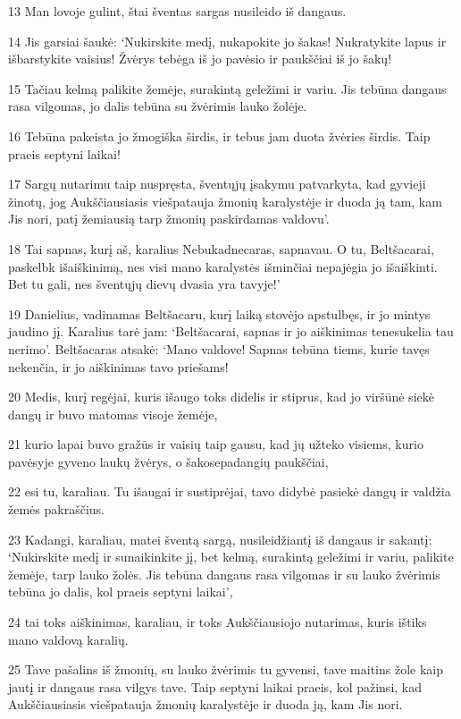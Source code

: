 \par 13 Man lovoje gulint, štai šventas sargas nusileido iš dangaus. 
\par 14 Jis garsiai šaukė: ‘Nukirskite medį, nukapokite jo šakas! Nukratykite lapus ir išbarstykite vaisius! Žvėrys tebėga iš jo pavėsio ir paukščiai iš jo šakų! 
\par 15 Tačiau kelmą palikite žemėje, surakintą geležimi ir variu. Jis tebūna dangaus rasa vilgomas, jo dalis tebūna su žvėrimis lauko žolėje. 
\par 16 Tebūna pakeista jo žmogiška širdis, ir tebus jam duota žvėries širdis. Taip praeis septyni laikai! 
\par 17 Sargų nutarimu taip nuspręsta, šventųjų įsakymu patvarkyta, kad gyvieji žinotų, jog Aukščiausiasis viešpatauja žmonių karalystėje ir duoda ją tam, kam Jis nori, patį žemiausią tarp žmonių paskirdamas valdovu’. 
\par 18 Tai sapnas, kurį aš, karalius Nebukadnecaras, sapnavau. O tu, Beltšacarai, paskelbk išaiškinimą, nes visi mano karalystės išminčiai nepajėgia jo išaiškinti. Bet tu gali, nes šventųjų dievų dvasia yra tavyje!’ 
\par 19 Danielius, vadinamas Beltšacaru, kurį laiką stovėjo apstulbęs, ir jo mintys jaudino jį. Karalius tarė jam: ‘Beltšacarai, sapnas ir jo aiškinimas tenesukelia tau nerimo’. Beltšacaras atsakė: ‘Mano valdove! Sapnas tebūna tiems, kurie tavęs nekenčia, ir jo aiškinimas tavo priešams! 
\par 20 Medis, kurį regėjai, kuris išaugo toks didelis ir stiprus, kad jo viršūnė siekė dangų ir buvo matomas visoje žemėje, 
\par 21 kurio lapai buvo gražūs ir vaisių taip gausu, kad jų užteko visiems, kurio pavėsyje gyveno laukų žvėrys, o šakose­padangių paukščiai, 
\par 22 esi tu, karaliau. Tu išaugai ir sustiprėjai, tavo didybė pasiekė dangų ir valdžia žemės pakraščius. 
\par 23 Kadangi, karaliau, matei šventą sargą, nusileidžiantį iš dangaus ir sakantį: ‘Nukirskite medį ir sunaikinkite jį, bet kelmą, surakintą geležimi ir variu, palikite žemėje, tarp lauko žolės. Jis tebūna dangaus rasa vilgomas ir su lauko žvėrimis tebūna jo dalis, kol praeis septyni laikai’, 
\par 24 tai toks aiškinimas, karaliau, ir toks Aukščiausiojo nutarimas, kuris ištiks mano valdovą karalių. 
\par 25 Tave pašalins iš žmonių, su lauko žvėrimis tu gyvensi, tave maitins žole kaip jautį ir dangaus rasa vilgys tave. Taip septyni laikai praeis, kol pažinsi, kad Aukščiausiasis viešpatauja žmonių karalystėje ir duoda ją, kam Jis nori. 
